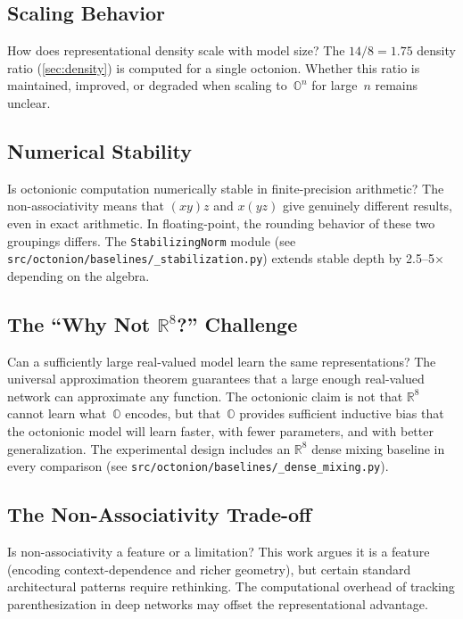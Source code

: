 \documentclass[11pt,a4paper]{article}
\newcommand{\Oct}{\mathbb{O}}
\newcommand{\Real}{\mathbb{R}}
\begin{document}
\subsection{Scaling Behavior}

How does representational density scale with model size? The $14/8 = 1.75$ density ratio (\cref{sec:density}) is computed for a single octonion. Whether this ratio is maintained, improved, or degraded when scaling to~$\Oct^n$ for large~$n$ remains unclear.

\subsection{Numerical Stability}

Is octonionic computation numerically stable in finite-precision arithmetic? The non-associativity means that $(xy)z$ and $x(yz)$ give genuinely different results, even in exact arithmetic. In floating-point, the rounding behavior of these two groupings differs. The \texttt{StabilizingNorm} module (see \texttt{src/octonion/baselines/\_stabilization.py}) extends stable depth by 2.5--5$\times$ depending on the algebra.

\subsection{The ``Why Not \texorpdfstring{$\Real^8$}{R8}?'' Challenge}

Can a sufficiently large real-valued model learn the same representations? The universal approximation theorem guarantees that a large enough real-valued network can approximate any function. The octonionic claim is not that $\Real^8$ cannot learn what~$\Oct$ encodes, but that~$\Oct$ provides sufficient inductive bias that the octonionic model will learn faster, with fewer parameters, and with better generalization. The experimental design includes an $\Real^8$ dense mixing baseline in every comparison (see \texttt{src/octonion/baselines/\_dense\_mixing.py}).

\subsection{The Non-Associativity Trade-off}

Is non-associativity a feature or a limitation? This work argues it is a feature (encoding context-dependence and richer geometry), but certain standard architectural patterns require rethinking. The computational overhead of tracking parenthesization in deep networks may offset the representational advantage.
\end{document}
